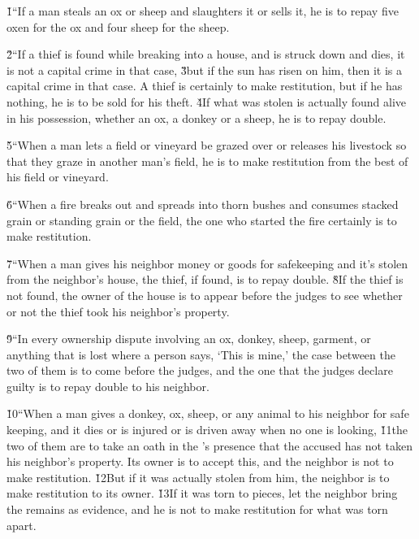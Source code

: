 \v{1}``If a man steals an ox or sheep and slaughters it or sells it, he is to repay five oxen for the ox and four sheep for the sheep.

\v{2}``If a thief is found while breaking into a house, and is struck down and dies, it is not a capital crime in that case, \v{3}but if the sun has risen on him, then it is a capital crime in that case. A thief is certainly to make restitution, but if he has nothing, he is to be sold for his theft. \v{4}If what was stolen is actually found alive in his possession, whether an ox, a donkey or a sheep, he is to repay double.

\v{5}``When a man lets a field or vineyard be grazed over or releases his livestock so that they graze in another man's field, he is to make restitution from the best of his field or vineyard.

\v{6}``When a fire breaks out and spreads into thorn bushes and consumes stacked grain or standing grain or the field, the one who started the fire certainly is to make restitution.

\v{7}``When a man gives his neighbor money or goods for safekeeping and it's stolen from the neighbor's house, the thief, if found, is to repay double. \v{8}If the thief is not found, the owner of the house is to appear before the judges to see whether or not the thief took his neighbor's property.

\v{9}``In every ownership dispute involving an ox, donkey, sheep, garment, or anything that is lost where a person says, `This is mine,' the case between the two of them is to come before the judges, and the one that the judges declare guilty is to repay double to his neighbor.

\v{10}``When a man gives a donkey, ox, sheep, or any animal to his neighbor for safe keeping, and it dies or is injured or is driven away when no one is looking, \v{11}the two of them are to take an oath in the 's presence that the accused has not taken his neighbor's property. Its owner is to accept this, and the neighbor is not to make restitution. \v{12}But if it was actually stolen from him, the neighbor is to make restitution to its owner. \v{13}If it was torn to pieces, let the neighbor bring the remains as evidence, and he is not to make restitution for what was torn apart.

